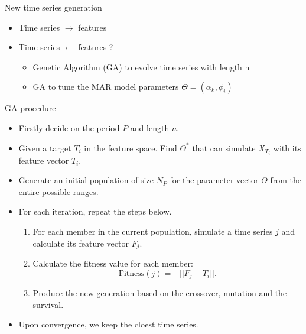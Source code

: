 \documentclass[11pt,ignorenonframetext,compress]{beamer}
\providecommand{\tightlist}{%
  \setlength{\itemsep}{0pt}\setlength{\parskip}{0pt}}
\begin{document}
\begin{frame}{New time series generation}

  \begin{itemize}
  \item
    Time series \(\rightarrow\) features \checkmark
  \item
    Time series \(\leftarrow\) features ?

    \begin{itemize}
      \tightlist
    \item
      Genetic Algorithm (GA) to evolve time series with length n
    \item
      GA to tune the MAR model parameters \(\Theta = (\alpha_k, \phi_i)\)
    \end{itemize}
  \end{itemize}

\end{frame}

\begin{frame}{GA procedure}

  \begin{itemize}
    \tightlist
  \item
    Firstly decide on the period \(P\) and length \(n\).
  \item
    Given a target \(T_i\) in the feature space. Find \(\Theta^{*}\) that
    can simulate \(X_{T_i}\) with its feature vector \(T_i\).
  \item
    Generate an initial population of size \(N_P\) for the parameter
    vector \(\Theta\) from the entire possible ranges.
  \item
    For each iteration, repeat the steps below.

    \begin{enumerate}
      \def\labelenumi{\arabic{enumi}.}
      \tightlist
    \item
      For each member in the current population, simulate a time series
      \(j\) and calculate its feature vector \(F_j\).
    \item
      Calculate the fitness value for each member:
      \[\text{Fitness}(j) = - ||F_j-T_i||.\]
    \item
      Produce the new generation based on the crossover, mutation and the
      survival.
    \end{enumerate}
  \item
    Upon convergence, we keep the cloest time series.
  \end{itemize}

\end{frame}
\end{document}
